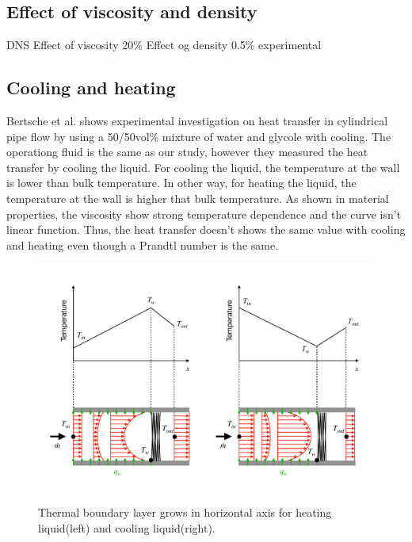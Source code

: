 \documentclass[12pt,oneside]{jbook}
\begin{document}
\subsection{Effect of viscosity and density}
DNS
Effect of viscosity 20\%
Effect og density   0.5\%
experimental

\clearpage

\subsection{Cooling and heating}
Bertsche et al.\cite{Bertsche2016} shows experimental investigation on heat transfer in cylindrical pipe flow by using a 50/50vol\% mixture of water and glycole with cooling.
The operationg fluid is the same as our study, however they measured the heat transfer by cooling the liquid.
For cooling the liquid, the temperature at the wall is lower than bulk temperature.
In other way, for heating the liquid, the temperature at the wall is higher that bulk temperature.
As shown in material properties, the viscosity show strong temperature dependence and the curve isn't linear function.
Thus, the heat transfer doesn't shows the same value with cooling and heating even though a Prandtl number is the same.
\begin{figure}[ht]
    \vspace{0zh}
	\begin{center}
		\includegraphics[width=1\linewidth]{fig/heating_and_cooling.pdf}
		\vspace{-2zh}
		\caption{Thermal boundary layer grows in horizontal axis for heating liquid(left) and cooling liquid(right).}
		\label{heating}
	\end{center}
	\vspace{0zh}
\end{figure}
\end{document}
